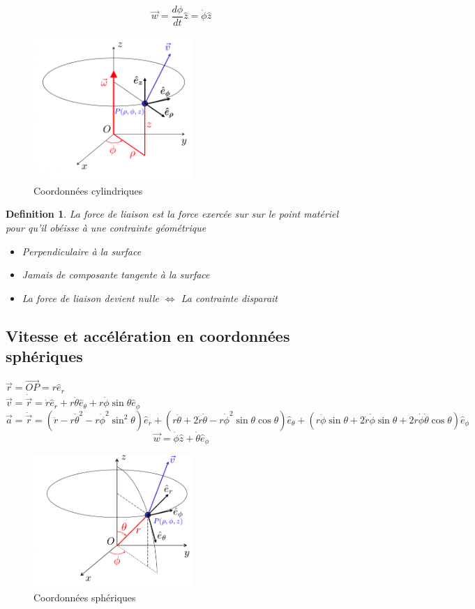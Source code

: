 \documentclass{article}
\newtheorem{definition}{Definition}[section]
\begin{document}
\[ \overrightarrow{w} = \frac{d\phi}{dt}\hat{z} = \dot{\phi}\hat{z}\]
\begin{figure}[htp]
    \centering
    \includegraphics[width=6cm]{Images/MCU.png}
    \caption{Coordonnées cylindriques}
    \label{fig:cylindre}
\end{figure}
\begin{definition}
    La force de liaison est la force exercée sur sur le point matériel pour qu'il obéisse à une contrainte géométrique
    \begin{itemize}
        \item Perpendiculaire à la surface
        \item Jamais de composante tangente à la surface
        \item La force de liaison devient nulle \(\Leftrightarrow\) La contrainte disparait
    \end{itemize}
\end{definition}
\newpage
\subsection{Vitesse et accélération en coordonnées sphériques}
\( \overrightarrow{r} = \overrightarrow{OP} = r\hat{e}_{r}\) \\
\( \overrightarrow{v} = \dot{\overrightarrow{r}} = \dot{r}\hat{e}_{r} + r\dot{\theta}\hat{e}_{\theta} + r\dot{\phi}\sin{\theta}\hat{e}_{\phi} \) \\
\( \overrightarrow{a} = \ddot{\overrightarrow{r}} = (\ddot{r} - r\dot{\theta}^2 - r\dot{\phi}^2 \sin^2{\theta})\hat{e}_{r} + (r\ddot{\theta} + 2\dot{r}\dot{\theta} - r\dot{\phi}^2 \sin{\theta}\cos{\theta})\hat{e}_{\theta} + (r\ddot{\phi}\sin{\theta} + 2\dot{r}\dot{\phi}\sin{\theta} + 2r\dot{\phi}\dot{\theta}\cos{\theta})\hat{e}_{\phi}  \) \\

\[ \overrightarrow{w} = \dot{\phi}\hat{z} + \dot{\theta}\hat{e}_{\phi} \]
\begin{figure}[htp]
    \centering
    \includegraphics[width=6cm]{Images/spherique.png}
    \caption{Coordonnées sphériques}
    \label{fig:spherique}
\end{figure}
\end{document}
